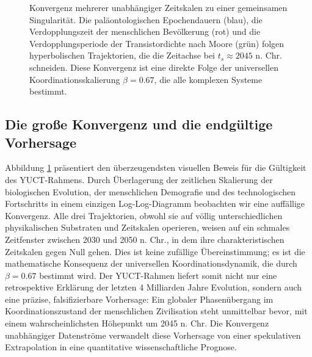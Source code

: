 \documentclass[12pt,a4paper]{article}
\theoremstyle{remark}
\begin{document}
\begin{figure}[htbp]
		\caption{Konvergenz mehrerer unabhängiger Zeitskalen zu einer gemeinsamen Singularität. Die paläontologischen Epochendauern (blau), die Verdopplungszeit der menschlichen Bevölkerung (rot) und die Verdopplungsperiode der Transistordichte nach Moore (grün) folgen hyperbolischen Trajektorien, die die Zeitachse bei $t_s \approx 2045$ n. Chr. schneiden. Diese Konvergenz ist eine direkte Folge der universellen Koordinationsskalierung $\beta = 0.67$, die alle komplexen Systeme bestimmt.}
		\label{fig:great-convergence}
	\end{figure}
	
	\subsection*{Die große Konvergenz und die endgültige Vorhersage}
	
	Abbildung \ref{fig:great-convergence} präsentiert den überzeugendsten visuellen Beweis für die Gültigkeit des YUCT-Rahmens. Durch Überlagerung der zeitlichen Skalierung der biologischen Evolution, der menschlichen Demografie und des technologischen Fortschritts in einem einzigen Log-Log-Diagramm beobachten wir eine auffällige Konvergenz. Alle drei Trajektorien, obwohl sie auf völlig unterschiedlichen physikalischen Substraten und Zeitskalen operieren, weisen auf ein schmales Zeitfenster zwischen 2030 und 2050 n. Chr., in dem ihre charakteristischen Zeitskalen gegen Null gehen. Dies ist keine zufällige Übereinstimmung; es ist die mathematische Konsequenz der universellen Koordinationsdynamik, die durch $\beta = 0.67$ bestimmt wird. Der YUCT-Rahmen liefert somit nicht nur eine retrospektive Erklärung der letzten 4 Milliarden Jahre Evolution, sondern auch eine präzise, falsifizierbare Vorhersage: Ein globaler Phasenübergang im Koordinationszustand der menschlichen Zivilisation steht unmittelbar bevor, mit einem wahrscheinlichsten Höhepunkt um 2045 n. Chr. Die Konvergenz unabhängiger Datenströme verwandelt diese Vorhersage von einer spekulativen Extrapolation in eine quantitative wissenschaftliche Prognose.
	
\end{document}
